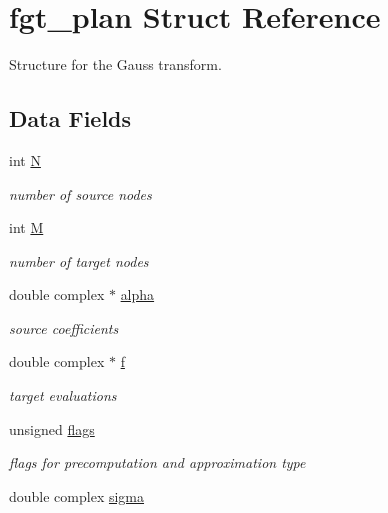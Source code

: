 \hypertarget{structfgt__plan}{
\section{fgt\_\-plan Struct Reference}
\label{structfgt__plan}
}
Structure for the Gauss transform.  


\subsection*{Data Fields}
\begin{CompactItemize}
\item 
\hypertarget{structfgt__plan_o0}{
int \hyperlink{structfgt__plan_o0}{N}}
\label{structfgt__plan_o0}

\begin{CompactList}\small\item\em number of source nodes \item\end{CompactList}\item 
\hypertarget{structfgt__plan_o1}{
int \hyperlink{structfgt__plan_o1}{M}}
\label{structfgt__plan_o1}

\begin{CompactList}\small\item\em number of target nodes \item\end{CompactList}\item 
\hypertarget{structfgt__plan_o2}{
double complex $\ast$ \hyperlink{structfgt__plan_o2}{alpha}}
\label{structfgt__plan_o2}

\begin{CompactList}\small\item\em source coefficients \item\end{CompactList}\item 
\hypertarget{structfgt__plan_o3}{
double complex $\ast$ \hyperlink{structfgt__plan_o3}{f}}
\label{structfgt__plan_o3}

\begin{CompactList}\small\item\em target evaluations \item\end{CompactList}\item 
\hypertarget{structfgt__plan_o4}{
unsigned \hyperlink{structfgt__plan_o4}{flags}}
\label{structfgt__plan_o4}

\begin{CompactList}\small\item\em flags for precomputation and approximation type \item\end{CompactList}\item 
\hypertarget{structfgt__plan_o5}{
double complex \hyperlink{structfgt__plan_o5}{sigma}}
\label{structfgt__plan_o5}


\end{CompactItemize}
